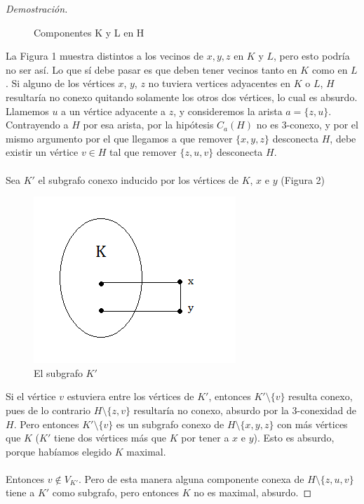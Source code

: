 \documentclass{article}
\begin{document}
\begin{proof}[Demostración]
\begin{figure}[h]
\caption{Componentes K y L en H}
\label{fig:kura1}
\end{figure}
La Figura 1 muestra distintos a los vecinos de $x, y, z$ en $K$ y $L$, pero esto podría no ser así. Lo que sí debe pasar es que deben tener vecinos tanto en $K$ como en $L$. Si alguno de los vértices $x$, $y$, $z$ no tuviera vertices adyacentes en $K$ o $L$, $H$ resultaría no conexo quitando solamente los otros dos vértices, lo cual es absurdo. Llamemos $u$ a un vértice adyacente a $z$, y consideremos la arista $a = \{z,u\}$. Contrayendo a $H$ por esa arista, por la hipótesis $C_a(H)$ no es 3-conexo, y por el mismo argumento por el que llegamos a que remover $\{x,y,z\}$ desconecta $H$, debe existir un vértice $v \in H$ tal que remover $\{z,u,v\}$ desconecta $H$. \\ \\
Sea $K'$ el subgrafo conexo inducido por los vértices de $K$, $x$ e $y$ (Figura 2) \\
\begin{figure}[htp]
\centering
\includegraphics{img/kura2}
\caption{El subgrafo $K'$}
\label{fig:kura1}
\end{figure}
\newpage
Si el vértice $v$ estuviera entre los vértices de $K'$, entonces $K'\setminus\{v\}$ resulta conexo, pues de lo contrario $H\setminus\{z,v\}$ resultaría no conexo, absurdo por la 3-conexidad de $H$. Pero entonces $K'\setminus\{v\}$ es un subgrafo conexo de  $H\setminus\{x,y,z\}$ con más vértices que $K$ ($K'$ tiene dos vértices más que $K$ por tener a $x$ e $y$). Esto es absurdo, porque habíamos elegido $K$ maximal. \\\\ Entonces $v \notin V_{K'}$. Pero de esta manera alguna componente conexa de \newline $H\setminus\{z,u,v\}$ tiene a $K'$ como subgrafo, pero entonces $K$ no es maximal, absurdo. 
\end{proof}
\end{document}
